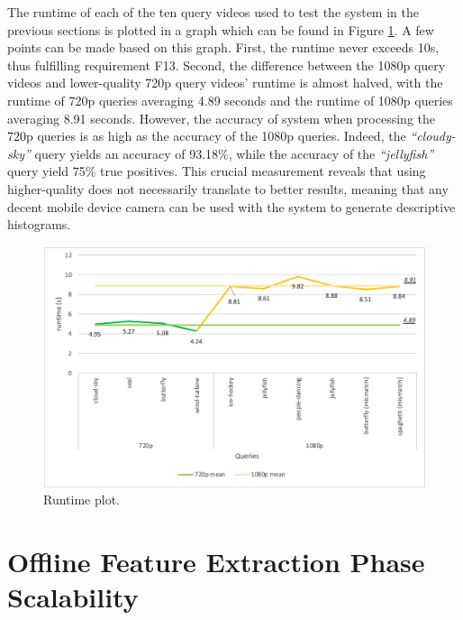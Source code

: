 The runtime of each of the ten query videos used to test the system in the previous sections is plotted in a graph which can be found in Figure \ref{fig:evaluation-runtime_plot}. A few points can be made based on this graph. First, the runtime never exceeds 10s, thus fulfilling requirement F13. Second, the difference between the 1080p query videos and lower-quality 720p query videos' runtime is almost halved, with the runtime of 720p queries averaging 4.89 seconds and the runtime of 1080p queries averaging 8.91 seconds. However, the accuracy of system when processing the 720p queries is as high as the accuracy of the 1080p queries. Indeed, the \textit{``cloudy-sky''} query yields an accuracy of 93.18\%, while the accuracy of the \textit{``jellyfish''} query yield 75\% true positives. This crucial measurement reveals that using higher-quality does not necessarily translate to better results, meaning that any decent mobile device camera can be used with the system to generate descriptive histograms.

\begin{figure}[h] 
\centerline{\includegraphics[width=\textwidth]{figures/evaluation/runtime_plot.png}}
\caption{\label{fig:evaluation-runtime_plot}Runtime plot.}
\end{figure}


\section{Offline Feature Extraction Phase Scalability}

